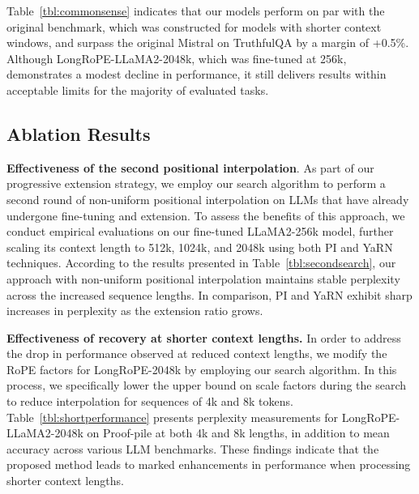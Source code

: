 Table~\ref{tbl:commonsense} indicates that our models perform on par with the original benchmark, which was constructed for models with shorter context windows, and surpass the original Mistral on TruthfulQA by a margin of +0.5\%. Although LongRoPE-LLaMA2-2048k, which was fine-tuned at 256k, demonstrates a modest decline in performance, it still delivers results within acceptable limits for the majority of evaluated tasks.

\subsection{Ablation Results}

\textbf{Effectiveness of the second positional interpolation}. As part of our progressive extension strategy, we employ our search algorithm to perform a second round of non-uniform positional interpolation on LLMs that have already undergone fine-tuning and extension. To assess the benefits of this approach, we conduct empirical evaluations on our fine-tuned LLaMA2-256k model, further scaling its context length to 512k, 1024k, and 2048k using both PI and YaRN techniques. According to the results presented in Table~\ref{tbl:secondsearch}, our approach with non-uniform positional interpolation maintains stable perplexity across the increased sequence lengths. In comparison, PI and YaRN exhibit sharp increases in perplexity as the extension ratio grows.

\textbf{Effectiveness of recovery at shorter context lengths.} In order to address the drop in performance observed at reduced context lengths, we modify the RoPE factors for LongRoPE-2048k by employing our search algorithm. In this process, we specifically lower the upper bound on scale factors during the search to reduce interpolation for sequences of 4k and 8k tokens. 
Table~\ref{tbl:shortperformance} presents perplexity measurements for LongRoPE-LLaMA2-2048k on Proof-pile at both 4k and 8k lengths, in addition to mean accuracy across various LLM benchmarks. These findings indicate that the proposed method leads to marked enhancements in performance when processing shorter context lengths.

